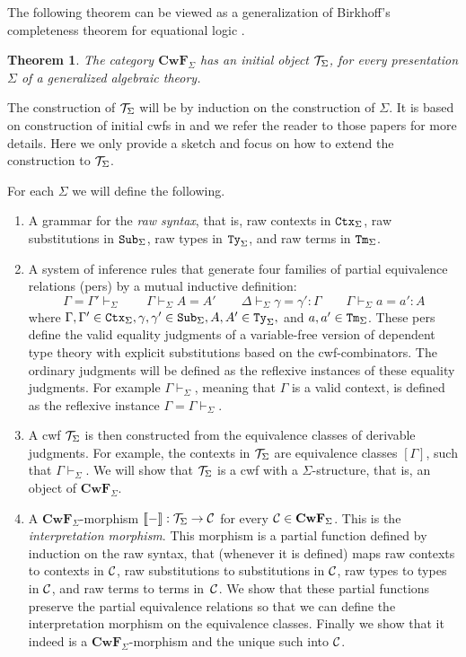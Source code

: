 \documentclass{mscs}
\newcommand{\FYI}[1]{{#1}}
\newtheorem{theorem}{Theorem}
\def\Cwf{\mathbf{CwF}}
\begin{document}
The following theorem can be viewed as a generalization of Birkhoff's completeness theorem for equational logic \cite{birkhoff}.
\begin{theorem}\label{initial-gat}
The category $\Cwf_\Sigma$ has an initial object ${\mathcal T}_\Sigma$,
for every \FYI{presentation} $\Sigma$ of a generalized algebraic theory.
\end{theorem}

The construction of ${\mathcal T}_\Sigma$ will be by induction on the construction of $\Sigma$. It is based on construction of initial cwfs in \cite{castellan:tlca2015,castellan:lmcs} and we refer the reader to those papers for more details. Here we only provide a sketch and focus on how to extend the construction to ${\mathcal T}_\Sigma$.

For each $\Sigma$ we will define the following.
\begin{enumerate}
\item
A grammar for the {\em raw syntax}, that is, raw contexts in ${\tt Ctx}_\Sigma$, raw substitutions in ${\tt Sub}_\Sigma$, raw types in ${\tt Ty}_\Sigma$, and raw terms in ${\tt Tm}_\Sigma$.
\item
A system of inference rules that generate four families of partial equivalence relations (pers) by a mutual inductive definition:
$$
\Gamma = \Gamma' \vdash_\Sigma
\qquad
\Gamma \vdash_\Sigma A = A'
\qquad
\Delta \vdash_\Sigma \gamma = \gamma' : \Gamma
\qquad
\Gamma \vdash_\Sigma a = a' : A
$$
where $\Gamma, \Gamma' \in {\tt Ctx}_\Sigma, \gamma, \gamma' \in {\tt Sub}_\Sigma, A, A' \in {\tt Ty}_\Sigma,$ and $a,a' \in {\tt Tm}_\Sigma$. These pers define the valid equality judgments of a variable-free version of dependent type theory with explicit substitutions based on the cwf-combinators. The ordinary judgments will be defined as the reflexive instances of these equality judgments. For example $\Gamma \vdash_\Sigma$, meaning that $\Gamma$ is a valid context, is defined as the reflexive instance $\Gamma = \Gamma \vdash_\Sigma$.
\item
A cwf ${\mathcal T}_\Sigma$ is then constructed from the equivalence classes of derivable judgments. For example, the contexts in ${\mathcal T}_\Sigma$ are equivalence classes $[\Gamma]$, such that $\Gamma \vdash_\Sigma$. We will show that ${\mathcal T}_\Sigma$ is a cwf with a $\Sigma$-structure, that is, an object of $\Cwf_\Sigma$.
\item
A $\Cwf_\Sigma$-morphism $\llbracket - \rrbracket : {\mathcal T}_\Sigma \to {\mathcal C}$ for every $\C \in \Cwf_\Sigma$. This is the {\em interpretation morphism}. This morphism is a partial function defined by induction on the raw syntax, that (whenever it is defined) maps raw contexts to contexts in ${\mathcal C}$, raw substitutions to substitutions in ${\mathcal C}$, raw types to types in ${\mathcal C}$, and raw terms to terms in~${\mathcal C}$. We show that these partial functions preserve the partial equivalence relations so that we can define the interpretation morphism on the equivalence classes. Finally we show that it indeed is a $\Cwf_\Sigma$-morphism and the unique such into ${\mathcal C}$.
\end{enumerate}
\end{document}
